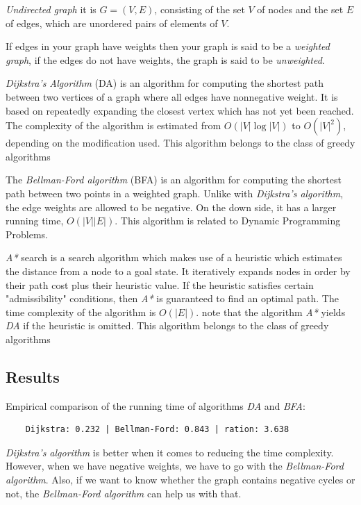 \textit{Undirected graph} it is $G = (V, E)$, consisting of the set $V$ of nodes and the set $E$ of edges, which are unordered pairs of elements of $V$.

If edges in your graph have weights then your graph is said to be a \textit{weighted graph}, if the edges do not have weights, the graph is said to be \textit{unweighted}.

\textit{Dijkstra's Algorithm} (DA) is an algorithm for computing the shortest path between two vertices of a graph where all edges have nonnegative weight.
It is based on repeatedly expanding the closest vertex which has not yet been reached.
The complexity of the algorithm is estimated from $O(\lvert V \rvert \log{\lvert V \rvert})$ to $O(\lvert V \rvert^2)$, depending on the modification used.
This algorithm belongs to the class of greedy algorithms

The \textit{Bellman-Ford algorithm} (BFA) is an algorithm for computing the shortest path between two points in a weighted graph.
Unlike with \textit{Dijkstra's algorithm}, the edge weights are allowed to be negative.
On the down side, it has a larger running time, $O(\lvert V \rvert \lvert E \rvert)$.
This algorithm is related to Dynamic Programming Problems.

\textit{A*} search is a search algorithm which makes use of a heuristic which estimates the distance from a node to a goal state.
It iteratively expands nodes in order by their path cost plus their heuristic value.
If the heuristic satisfies certain "admissibility" conditions, then \textit{A*} is guaranteed to find an optimal path.
The time complexity of the algorithm is $O(\lvert E \rvert)$.
note that the algorithm \textit{A*} yields \textit{DA} if the heuristic is omitted.
This algorithm belongs to the class of greedy algorithms

\subsection{Results}\label{subsec:results}

Empirical comparison of the running time of algorithms \textit{DA} and \textit{BFA}:

\begin{verbatim}
    Dijkstra: 0.232 | Bellman-Ford: 0.843 | ration: 3.638
\end{verbatim}

\textit{Dijkstra's algorithm} is better when it comes to reducing the time complexity.
However, when we have negative weights, we have to go with the \textit{Bellman-Ford algorithm}.
Also, if we want to know whether the graph contains negative cycles or not, the \textit{Bellman-Ford algorithm} can help us with that.

